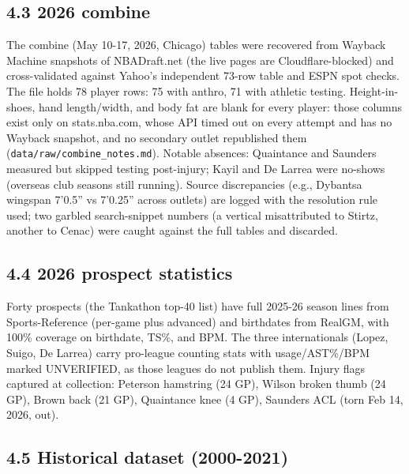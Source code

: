 \documentclass[
  10pt,
]{article}
\begin{document}
\subsection{4.3 2026 combine}\label{combine}

The combine (May 10-17, 2026, Chicago) tables were recovered from Wayback
Machine snapshots of NBADraft.net (the live pages are Cloudflare-blocked) and
cross-validated against Yahoo's independent 73-row table and ESPN spot checks.
The file holds 78 player rows: 75 with anthro, 71 with athletic testing.
Height-in-shoes, hand length/width, and body fat are blank for every player:
those columns exist only on stats.nba.com, whose API timed out on every attempt
and has no Wayback snapshot, and no secondary outlet republished them
(\texttt{data/raw/combine\_notes.md}). Notable absences: Quaintance and Saunders
measured but skipped testing post-injury; Kayil and De Larrea were no-shows
(overseas club seasons still running). Source discrepancies (e.g., Dybantsa
wingspan 7'0.5'' vs 7'0.25'' across outlets) are logged with the resolution rule
used; two garbled search-snippet numbers (a vertical misattributed to Stirtz,
another to Cenac) were caught against the full tables and discarded.

\subsection{4.4 2026 prospect statistics}\label{prospect-statistics}

Forty prospects (the Tankathon top-40 list) have full 2025-26 season lines from
Sports-Reference (per-game plus advanced) and birthdates from RealGM, with 100\%
coverage on birthdate, TS\%, and BPM. The three internationals (Lopez, Suigo, De
Larrea) carry pro-league counting stats with usage/AST\%/BPM marked UNVERIFIED,
as those leagues do not publish them. Injury flags captured at collection:
Peterson hamstring (24 GP), Wilson broken thumb (24 GP), Brown back (21 GP),
Quaintance knee (4 GP), Saunders ACL (torn Feb 14, 2026, out).

\subsection{4.5 Historical dataset
(2000-2021)}\label{historical-dataset-2000-2021}
\end{document}

